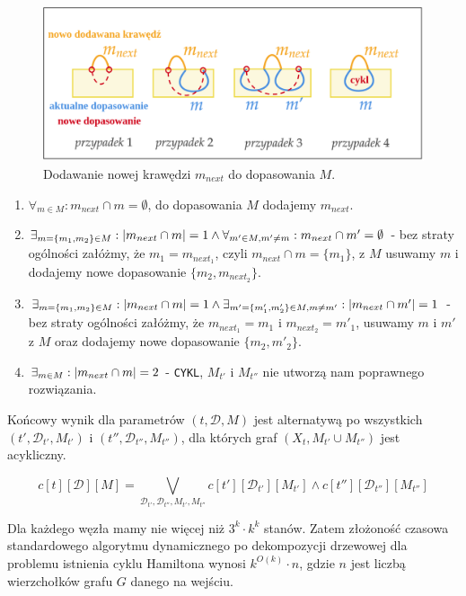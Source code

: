 \documentclass[12pt, oneside]{report}
\newcommand\Omicron{O}
\begin{document}
\begin{figure}
\centering
\includegraphics[width=16cm]{hamiltonian_merge.png}
\caption{Dodawanie nowej krawędzi $m_{next}$ do dopasowania $M$.}
\label{hamiltonian_merge}
\end{figure}

\begin{enumerate}
\item $\forall_{m \in M}: m_{next} \cap m = \emptyset$, do dopasowania $M$ dodajemy $m_{next}$.
\item $\exists_{m = \{m_1, m_2\} \in M}: \abs{m_{next} \cap m} = 1 \wedge \forall_{m' \in M, m' \ne m}: m_{next} \cap m' = \emptyset$ - bez straty ogólności załóżmy, że $m_1 = m_{next_1}$, czyli $m_{next} \cap m = \{m_1\}$, z $M$ usuwamy $m$ i dodajemy nowe dopasowanie $\{m_2, m_{next_2}\}$.
\item $\exists_{m = \{m_1, m_2\} \in M}: \abs{m_{next} \cap m} = 1 \wedge \exists_{m' = \{m'_1, m'_2\} \in M, m \ne m'}: \abs{m_{next} \cap m'} = 1$ - bez straty ogólności załóżmy, że $m_{next_1} = m_1$ i $m_{next_2} = m'_1$, usuwamy $m$ i $m'$ z $M$ oraz dodajemy nowe dopasowanie $\{m_2, m'_2\}$.
\item $\exists_{m \in M}: \abs{m_{next} \cap m} = 2$ - \texttt{CYKL}, $M_{t'}$ i $M_{t''}$ nie utworzą nam poprawnego rozwiązania.
\end{enumerate}

Końcowy wynik dla parametrów $(t, \mathcal{D}, M)$ jest alternatywą po wszystkich $(t', \mathcal{D}_{t'}, M_{t'})$ i $(t'', \mathcal{D}_{t''}, M_{t''})$, dla których graf $(X_t, M_{t'} \cup M_{t''})$ jest acykliczny.

$$c[t][\mathcal{D}][M] = \bigvee \limits_{\mathcal{D}_{t'}, \mathcal{D}_{t''}, M_{t'}, M_{t''}} c[t'][\mathcal{D}_{t'}][M_{t'}] \wedge c[t''][\mathcal{D}_{t''}][M_{t''}]$$

Dla każdego węzła mamy nie więcej niż $3^k \cdot k^k$ stanów. Zatem złożoność czasowa standardowego algorytmu dynamicznego po dekompozycji drzewowej dla problemu istnienia cyklu Hamiltona wynosi $k^{\Omicron(k)} \cdot n$, gdzie $n$ jest liczbą wierzchołków grafu $G$ danego na wejściu. 
\end{document}
